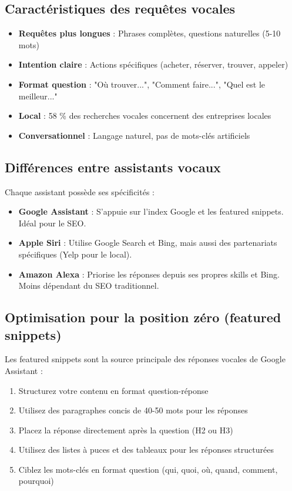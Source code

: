 \documentclass[12pt,a4paper,twoside]{report}
\begin{document}
\subsection{Caractéristiques des requêtes vocales}

\begin{itemize}
    \item \textbf{Requêtes plus longues} : Phrases complètes, questions naturelles (5-10 mots)
    \item \textbf{Intention claire} : Actions spécifiques (acheter, réserver, trouver, appeler)
    \item \textbf{Format question} : "Où trouver...", "Comment faire...", "Quel est le meilleur..."
    \item \textbf{Local} : 58 \% des recherches vocales concernent des entreprises locales
    \item \textbf{Conversationnel} : Langage naturel, pas de mots-clés artificiels
\end{itemize}

\subsection{Différences entre assistants vocaux}

Chaque assistant possède ses spécificités :

\begin{itemize}
    \item \textbf{Google Assistant} : S'appuie sur l'index Google et les featured snippets. Idéal pour le SEO.
    \item \textbf{Apple Siri} : Utilise Google Search et Bing, mais aussi des partenariats spécifiques (Yelp pour le local).
    \item \textbf{Amazon Alexa} : Priorise les réponses depuis ses propres skills et Bing. Moins dépendant du SEO traditionnel.
\end{itemize}

\subsection{Optimisation pour la position zéro (featured snippets)}

Les featured snippets sont la source principale des réponses vocales de Google Assistant :

\begin{enumerate}
    \item Structurez votre contenu en format question-réponse
    \item Utilisez des paragraphes concis de 40-50 mots pour les réponses
    \item Placez la réponse directement après la question (H2 ou H3)
    \item Utilisez des listes à puces et des tableaux pour les réponses structurées
    \item Ciblez les mots-clés en format question (qui, quoi, où, quand, comment, pourquoi)
\end{enumerate}
\end{document}
